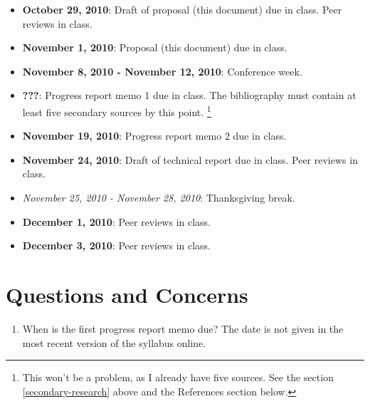 \documentclass[12pt]{article}
\begin{document}
\begin{itemize}
\item \textbf{October 29, 2010}: Draft of proposal (this document) due
in class.  Peer reviews in class.
\item \textbf{November 1, 2010}: Proposal (this document) due in class. 
\item \textbf{November 8, 2010 - November 12, 2010}: Conference week. 
\item \textbf{???}: Progress report memo 1 due in class.  The bibliography must contain at least five secondary sources by this point. \footnote{This won't be a problem, as I already have five sources.  See the section \ref{secondary-research} above and the References section below.}
\item \textbf{November 19, 2010}: Progress report memo 2 due in class.
\item \textbf{November 24, 2010}: Draft of technical report due in
class.  Peer reviews in class.
\item \textit{November 25, 2010 - November 28, 2010}: Thanksgiving break.
\item \textbf{December 1, 2010}: Peer reviews in class.
\item \textbf{December 3, 2010}: Peer reviews in class.
\end{itemize}

\section{Questions and Concerns}
\begin{enumerate}
\item When is the first progress report memo due?  The date is not given in the most recent version of the syllabus online.
\end{enumerate}
\nocite{*}


\label{refs}
\end{document}
